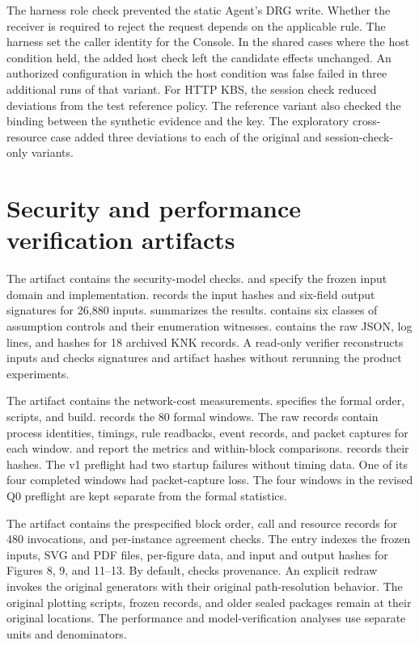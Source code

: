 The harness role check prevented the static Agent's DRG write. Whether the receiver is required to reject the request depends on the applicable rule. The harness set the caller identity for the Console. In the shared cases where the host condition held, the added host check left the candidate effects unchanged. An authorized configuration in which the host condition was false failed in three additional runs of that variant. For HTTP KBS, the session check reduced deviations from the test reference policy. The reference variant also checked the binding between the synthetic evidence and the key. The exploratory cross-resource case added three deviations to each of the original and session-check-only variants.

\section{Security and performance verification artifacts}\label{security-and-performance-verification-artifacts}

The  artifact contains the security-model checks.  and  specify the frozen input domain and implementation.  records the input hashes and six-field output signatures for 26,880 inputs.  summarizes the results.  contains six classes of assumption controls and their enumeration witnesses.  contains the raw JSON, log lines, and hashes for 18 archived KNK records. A read-only verifier reconstructs inputs and checks signatures and artifact hashes without rerunning the product experiments.

The  artifact contains the network-cost measurements.  specifies the formal order, scripts, and build.  records the 80 formal windows. The raw records contain process identities, timings, rule readbacks, event records, and packet captures for each window.  and  report the metrics and within-block comparisons.  records their hashes. The v1 preflight had two startup failures without timing data. One of its four completed windows had packet-capture loss. The four windows in the revised Q0 preflight are kept separate from the formal statistics.

The  artifact contains the prespecified block order, call and resource records for 480 invocations, and per-instance agreement checks. The  entry indexes the frozen inputs, SVG and PDF files, per-figure data, and input and output hashes for Figures 8, 9, and 11--13. By default,  checks provenance. An explicit redraw invokes the original generators with their original path-resolution behavior. The original plotting scripts, frozen records, and older sealed packages remain at their original locations. The performance and model-verification analyses use separate units and denominators.
